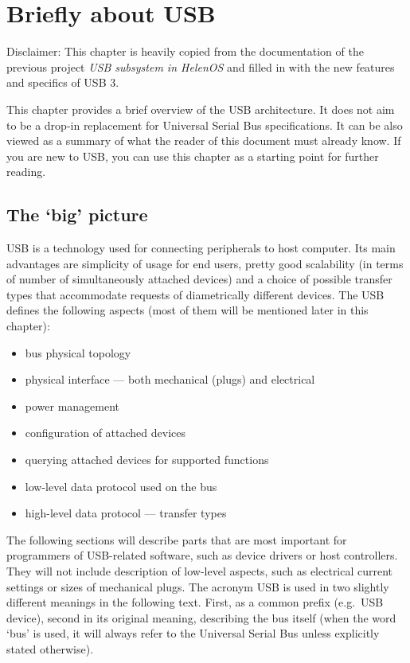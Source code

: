 \section{Briefly about USB}
\label{sec:usb_briefly}

Disclaimer: This chapter is heavily copied from the documentation of the
previous project \textit{USB subsystem in HelenOS}\cite{helenos:helusb} and filled in with the new
features and specifics of USB 3.

This chapter provides a brief overview of the USB architecture. It does not aim
to be a drop-in replacement for Universal Serial Bus specifications. It can be
also viewed as a summary of what the reader of this document must already know.
If you are new to USB, you can use this chapter as a starting point for further
reading.

\subsection{The ‘big’ picture}

USB is a technology used for connecting peripherals to host computer. Its main
advantages are simplicity of usage for end users, pretty good scalability (in
terms of number of simultaneously attached devices) and a choice of possible
transfer types that accommodate requests of diametrically different devices.
The USB defines the following aspects (most of them will be mentioned later in
this chapter):

\begin{itemize}
\item bus physical topology
\item physical interface — both mechanical (plugs) and electrical
\item power management
\item configuration of attached devices
\item querying attached devices for supported functions
\item low-level data protocol used on the bus
\item high-level data protocol — transfer types
\end{itemize}

The following sections will describe parts that are most important for
programmers of USB-related software, such as device drivers or host
controllers. They will not include description of low-level aspects, such as
electrical current settings or sizes of mechanical plugs. The acronym USB is
used in two slightly different meanings in the following text. First, as a
common prefix (e.g.\ USB device), second in its original meaning, describing the
bus itself (when the word ‘bus’ is used, it will always refer to the Universal
Serial Bus unless explicitly stated otherwise).


